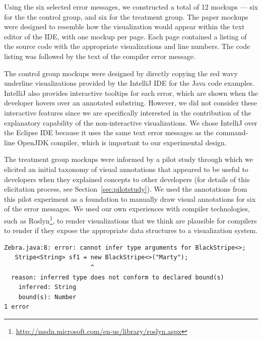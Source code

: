 \documentclass[conference]{IEEEtran}
\begin{document}
Using the six selected error messages, we constructed a total of 12 mockups --- six for the the control group, and six for the treatment group. The paper mockups were designed to resemble how the visualization would appear within the text editor of the IDE, with one mockup per page. Each page contained a listing of the source code with the appropriate visualizations and line numbers. The code listing was followed by the text of the compiler error message.

The control group mockups were designed by directly copying the red wavy underline visualizations provided by the IntelliJ IDE for the Java code examples. IntelliJ also provides interactive tooltips for each error, which are shown when the developer hovers over an annotated substring. However, we did not consider these interactive features since we are specifically interested in the contribution of the explanatory capability of the non-interactive visualizations. We chose IntelliJ over the Eclipse IDE because it uses the same text error messages as the command-line OpenJDK compiler, which is important to our experimental design.

The treatment group mockups were informed by a pilot study through which we elicited an initial taxonomy of visual annotations that appeared to be useful to developers when they explained concepts to other developers (for details of this elicitation process, see Section~\ref{sec:pilotstudy}). We used the annotations from this pilot experiment as a foundation to  manually draw visual annotations for six of the error messages. 
We used our own experiences with compiler technologies, such as Roslyn\footnote{\url{http://msdn.microsoft.com/en-us/library/roslyn.aspx}}, to render visualizations that we think are plausible for compilers to render if they expose the appropriate data structures to a visualization system.


\newsavebox{\zebralisting}
\begin{lrbox}{\zebralisting}
\begin{lstlisting}[style=JavaError]
Zebra.java:8: error: cannot infer type arguments for BlackStripe<>;
   Stripe<String> sf1 = new BlackStripe<>("Marty");
                        ^
  reason: inferred type does not conform to declared bound(s)
    inferred: String
    bound(s): Number
1 error
\end{lstlisting}
\end{lrbox}
\end{document}
